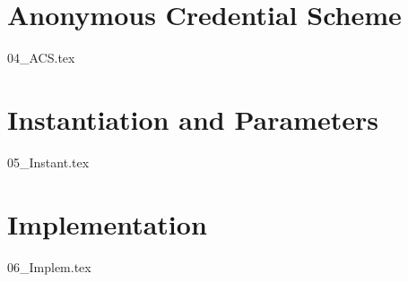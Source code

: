 {\section{Anonymous Credential Scheme}\label{sec:anonymous_credential_scheme}
{04_ACS.tex}

\section{Instantiation and Parameters}\label{sec:instanciation_parameters}
\label{sec:Instanciation}
{05_Instant.tex}

\section{Implementation}\label{sec:implementation}
{06_Implem.tex}

\iffalse


\fi

}
